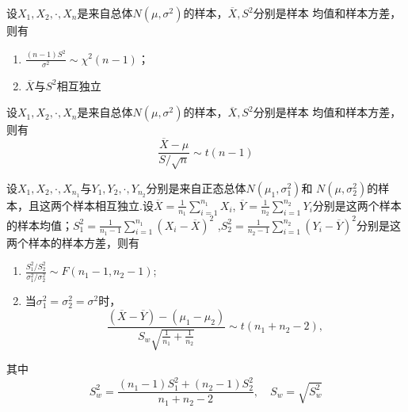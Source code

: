 \begin{theorem}
    设$X_1,X_2,\cdot,X_n$是来自总体$N(\mu,\sigma^2)$的样本，$\overline{X},S^2$分别是样本
    均值和样本方差，则有
    \begin{enumerate}[1°]
        \item $\displaystyle{\frac{(n-1)S^2}{\sigma^2}\sim \chi^2(n-1)}$；
        \item $\overline{X}$与$S^2$相互独立
    \end{enumerate} 
\end{theorem}

\begin{theorem}
    设$X_1,X_2,\cdot,X_n$是来自总体$N(\mu,\sigma^2)$的样本，$\overline{X},S^2$分别是样本
    均值和样本方差，则有
    $$\frac{\overline{X}-\mu}{S/\sqrt{n}}\sim t(n-1)$$
\end{theorem}

\begin{theorem}
    设$X_1,X_2,\cdot,X_{n_1}$与$Y_1,Y_2,\cdot,Y_{n_2}$分别是来自正态总体$N(\mu_1,\sigma_1^2)$和
    $N(\mu,\sigma_2^2)$的样本，且这两个样本相互独立.设$\displaystyle{\overline{X}=\frac{1}{n_1}\sum_{i=1}^{n_1}X_i}$,
    $\displaystyle{\overline{Y}=\frac{1}{n_2}\sum_{i=1}^{n_2}Y_i}$分别是这两个样本的样本均值；$\displaystyle{S_1^2=\frac{1}{n_1-1}\sum_{i=1}^{n_1}{(X_i-\overline{X})}^2}$
    ,$\displaystyle{S^2_2=\frac{1}{n_2-1}\sum_{i=1}^{n_2}{(Y_i-\overline{Y})}^2}$分别是这两个样本的样本方差，则有
    \begin{enumerate}[1°]
        \item $\displaystyle{\frac{S_1^2/S_2^2}{\sigma_1^2/\sigma_2^2}\sim F(n_1-1,n_2-1)}$;
        \item 当$\sigma_1^2=\sigma_2^2=\sigma^2$时，
        $$\frac{(\overline{X}-\overline{Y})-(\mu_1-\mu_2)}{S_w\sqrt{\frac{1}{n_1}+\frac{1}{n_2}}}\sim t(n_1+n_2-2),$$
    \end{enumerate}
    其中
    $$S_w^2=\frac{(n_1-1)S_1^2+(n_2-1)S_2^2}{n_1+n_2-2},\quad S_w=\sqrt{S_w^2}$$
\end{theorem}